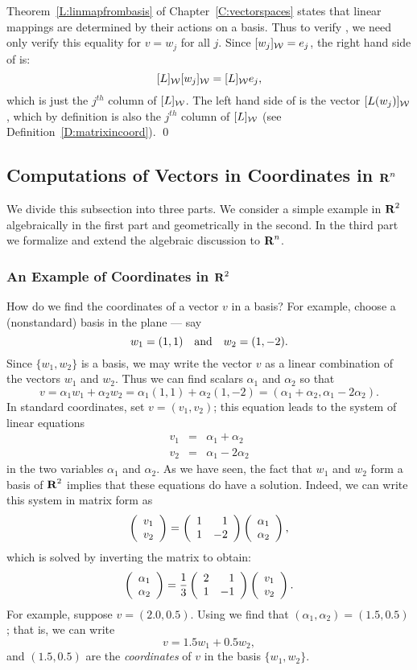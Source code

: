 Theorem~\ref{L:linmapfrombasis} of Chapter~\ref{C:vectorspaces}
states that linear mappings are determined by their actions on a
basis.  Thus to verify , we need only verify this
equality for $v=w_j$ for all $j$.  Since $[w_j]_{\cal W}=e_j$, the right
hand side of  is:
\[
[L]_{\cal W} [w_j]_{\cal W} =  [L]_{\cal W} e_j,
\]
which is just the $j^{th}$ column of $[L]_{\cal W}$.  The left hand side of
 is the vector $[L(w_j)]_{\cal W}$, which by definition is
also the $j^{th}$ column of $[L]_{\cal W}$
(see Definition~\ref{D:matrixincoord}).    \qed


\subsection*{Computations of Vectors in Coordinates in $\mbox{$\bf{R}$}^n$}

We divide this subsection into three parts.  We consider a simple example in
$\mbox{$\bf{R}$}^2$ algebraically in the first part and geometrically in the second.  In
the third part we formalize and extend the algebraic discussion to $\mbox{$\bf{R}$}^n$.

\subsubsection*{An Example of Coordinates in $\mbox{$\bf{R}$}^2$}

How do we find the coordinates of a vector $v$ in a basis?  For example,
choose a (nonstandard) basis in the plane --- say
\[
w_1=(1,1) \quad\mbox{and}\quad w_2=(1,-2).
\]
Since $\{w_1,w_2\}$ is a basis, we may write the vector
$v$ as a linear combination of the vectors $w_1$ and
$w_2$.  Thus we can find scalars $\alpha_1$ and $\alpha_2$ so
that
\[
v=\alpha_1 w_1 + \alpha_2 w_2 = \alpha_1(1,1)+\alpha_2(1,-2)
= (\alpha_1+ \alpha_2,\alpha_1 -2 \alpha_2).
\]
In standard coordinates, set $v=(v_1,v_2)$; this equation leads to the
system of linear equations
\begin{eqnarray*}
v_1 & = & \alpha_1 + \alpha_2 \\
v_2 & = & \alpha_1 -2 \alpha_2
\end{eqnarray*}
in the two variables $\alpha_1$ and $\alpha_2$. As we have seen,
the fact that $w_1$ and $w_2$ form a basis of $\mbox{$\bf{R}$}^2$ implies that
these equations do have a solution.  Indeed, we can write this
system in matrix form as
\[
\left(\begin{array}{r} v_1 \\ v_2\end{array}\right) = \left(\begin{array}{rr} 1 & 1\\ 1 &-2\end{array}\right)\left(\begin{array}{r} \alpha_1 \\ \alpha_2\end{array}\right),
\]
which is solved by inverting the matrix to obtain:
\begin{equation} \label{change1}
\left(\begin{array}{r} \alpha_1 \\ \alpha_2\end{array}\right)= \frac{1}{3}\left(\begin{array}{rr} 2 & 1\\ 1 &-1\end{array}\right)
\left(\begin{array}{r} v_1 \\ v_2\end{array}\right).
\end{equation}
For example, suppose $v=(2.0,0.5)$.  Using  we find that
$(\alpha_1,\alpha_2)=(1.5,0.5)$; that is, we can write
\[
v = 1.5w_1 + 0.5w_2,
\]
and $(1.5,0.5)$ are the {\em coordinates\/}  of
$v$ in the basis $\{w_1,w_2\}$.

